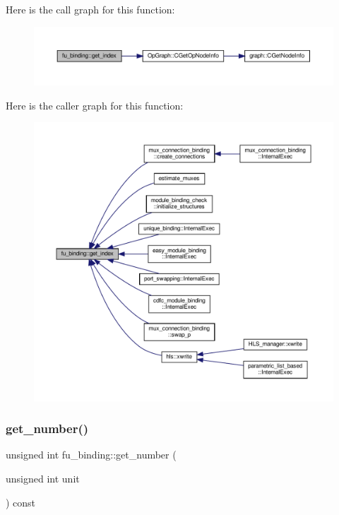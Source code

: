 Here is the call graph for this function\+:
\nopagebreak
\begin{figure}[H]
\begin{center}
\leavevmode
\includegraphics[width=350pt]{d8/d04/classfu__binding_aaf7a77c359203fa9866bc452550891e5_cgraph}
\end{center}
\end{figure}
Here is the caller graph for this function\+:
\nopagebreak
\begin{figure}[H]
\begin{center}
\leavevmode
\includegraphics[width=350pt]{d8/d04/classfu__binding_aaf7a77c359203fa9866bc452550891e5_icgraph}
\end{center}
\end{figure}
\mbox{\label{classfu__binding_ae55092e8c48ea5924dfd46ea56141ff8}} 
\subsubsection{\texorpdfstring{get\+\_\+number()}{get\_number()}}
{\footnotesize\ttfamily unsigned int fu\+\_\+binding\+::get\+\_\+number (\begin{DoxyParamCaption}\item[{unsigned int}]{unit }\end{DoxyParamCaption}) const\hspace{0.3cm}{\ttfamily [inline]}}



